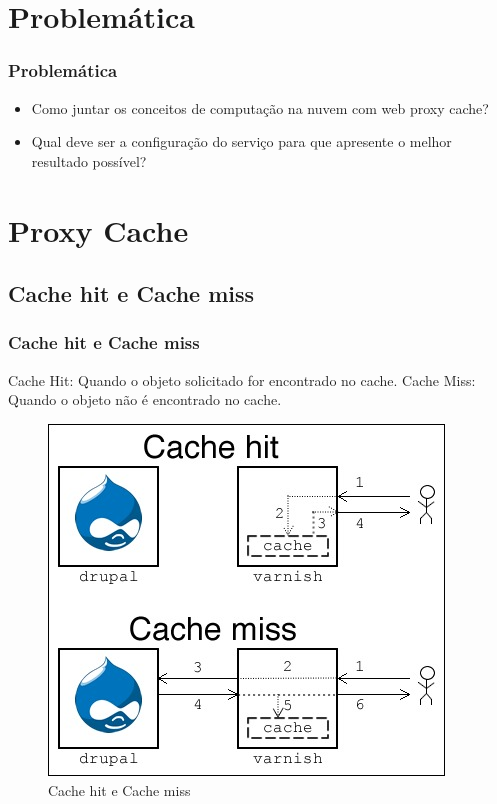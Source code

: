 \documentclass{beamer}
\begin{document}
    \section{Problemática}
    \begin{frame}
     \frametitle{Problemática}
     \begin{itemize}
       \item Como juntar os conceitos de computação na nuvem com web proxy cache?
       \item Qual deve ser a configuração do serviço para que apresente o melhor resultado possível?
      \end{itemize}
    \end{frame}
    \section{Proxy Cache}
    \subsection{Cache hit e Cache miss}
    \begin{frame}
      \frametitle{Cache hit e Cache miss}
      Cache Hit: Quando o objeto solicitado for encontrado no cache.
      Cache Miss: Quando o objeto não é encontrado no cache.

      \begin{figure}
       \centering
       \includegraphics[scale=0.4]{imagens/cachehit.jpg}
       \caption{Cache hit e Cache miss}
      \end{figure}

    \end{frame}
\end{document}
